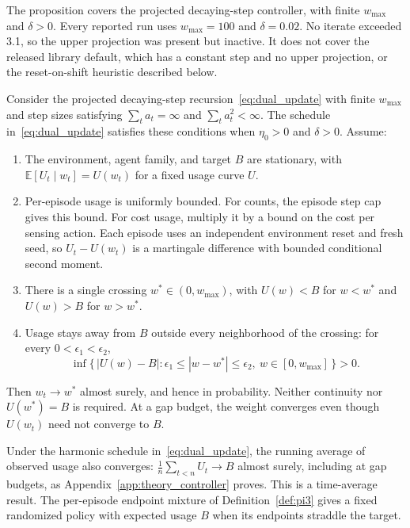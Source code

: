 \documentclass[runningheads]{llncs}
\begin{document}
The proposition covers the projected decaying-step controller, with finite $w_{\max}$ and $\delta>0$. Every reported run uses $w_{\max}=100$ and $\delta=0.02$. No iterate exceeded 3.1, so the upper projection was present but inactive. It does not cover the released library default, which has a constant step and no upper projection, or the reset-on-shift heuristic described below.

\begin{proposition}
\label{prop:pi5}
Consider the projected decaying-step recursion~\eqref{eq:dual_update} with finite $w_{\max}$ and step sizes satisfying $\sum_t a_t=\infty$ and $\sum_t a_t^2<\infty$. The schedule in~\eqref{eq:dual_update} satisfies these conditions when $\eta_0>0$ and $\delta>0$. Assume:
\begin{enumerate}
\item[(i)] The environment, agent family, and target $B$ are stationary, with $\mathbb{E}[U_t\mid w_t]=U(w_t)$ for a fixed usage curve $U$.
\item[(ii)] Per-episode usage is uniformly bounded. For counts, the episode step cap gives this bound. For cost usage, multiply it by a bound on the cost per sensing action. Each episode uses an independent environment reset and fresh seed, so $U_t-U(w_t)$ is a martingale difference with bounded conditional second moment.
\item[(iii)] There is a single crossing $w^*\in(0,w_{\max})$, with $U(w)<B$ for $w<w^*$ and $U(w)>B$ for $w>w^*$.
\item[(iv)] Usage stays away from $B$ outside every neighborhood of the crossing: for every $0<\epsilon_1<\epsilon_2$,
\[
\inf\{\,|U(w)-B|:\epsilon_1\le|w-w^*|\le\epsilon_2,\ w\in[0,w_{\max}]\,\}>0.
\]
\end{enumerate}
Then $w_t\to w^*$ almost surely, and hence in probability. Neither continuity nor $U(w^*)=B$ is required. At a gap budget, the weight converges even though $U(w_t)$ need not converge to $B$.

Under the harmonic schedule in~\eqref{eq:dual_update}, the running average of observed usage also converges: $\frac1n\sum_{t<n}U_t\to B$ almost surely, including at gap budgets, as Appendix~\ref{app:theory_controller} proves. This is a time-average result. The per-episode endpoint mixture of Definition~\ref{def:pi3} gives a fixed randomized policy with expected usage $B$ when its endpoints straddle the target.
\end{proposition}
\end{document}
